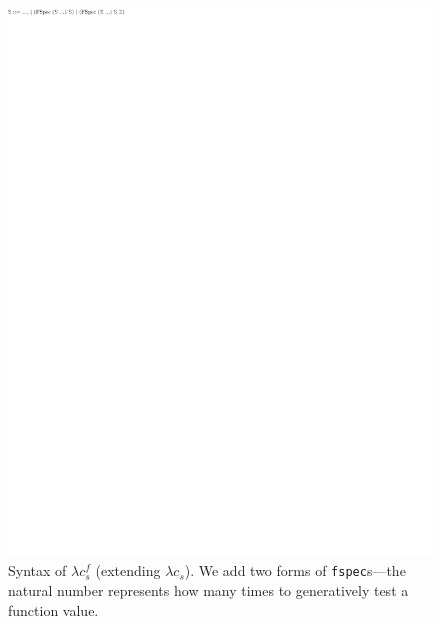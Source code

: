 %
\begin{figure}
  \includegraphics[]{redex/clojurespechof-grammar.pdf}
\caption{Syntax of $\lambda c_s^f$ (extending $\lambda c_s$).
  We add two forms of \texttt{fspec}s---the natural number represents how
  many times to generatively test a function value.
  }
\end{figure}


